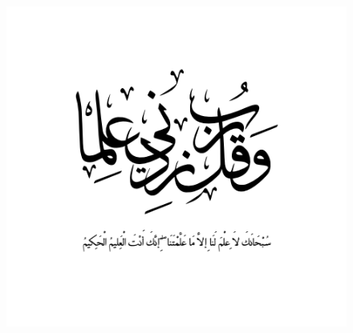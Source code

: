 \documentclass[a4paper]{report}
\begin{document}
\begin{figure}
    \centering
    \includegraphics[width=15cm]{images/rabbi zidni ilma.PNG}
\end{figure}
\newpage
\end{document}
